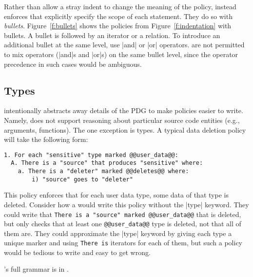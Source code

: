 Rather than allow a stray indent to change the meaning of the policy,
\syslang{} instead enforces that \ces{} explicitly specify the scope of each statement.
%
They do so with \emph{bullets}.
%
Figure~\ref{f:bullets} shows the policies from Figure~\ref{f:indentation} with \syslang{} bullets.
%
A bullet is followed by an iterator or a relation.
%
To introduce an additional bullet at the same level, \Ces{} use |and| or |or| operators.
%
\Ces{} are not permitted to mix operators (|and|s and |or|s) on the same bullet level,
since the operator precedence in such cases would be ambiguous.

\subsection{Types}
\syslang{} intentionally abstracts away details of the PDG to make policies easier to write.
%
Namely, \syslang{} does not support reasoning about particular source code entities (e.g., arguments, functions).
%
The one exception is types.
%
A typical data deletion policy will take the following form:
\begin{lstlisting}[language=CNL]
1. For each "sensitive" type marked @@user_data@@:
  A. There is a "source" that produces "sensitive" where:
    a. There is a "deleter" marked @@deletes@@ where:
        i) "source" goes to "deleter"
\end{lstlisting}
%
This policy enforces that for each user data type, some data of that type is deleted.
%
Consider how a \ce{} would write this policy without the |type| keyword.
%
They could write that \lstinline[language=CNL]|There is a "source" marked @@user_data@@| that is deleted,
but only checks that at least one \lstinline[language=CNL]|@@user_data@@| type is deleted, not that all of them are.
%
They could approximate the |type| keyword by giving each type a unique marker and using \lstinline[language=CNL]|There is|
iterators for each of them, but such a policy would be tedious to write and easy to get wrong.

\syslang{}'s full grammar is in .
